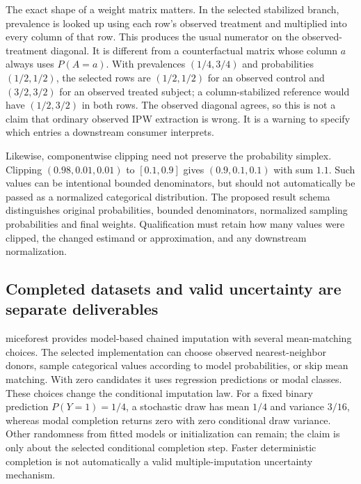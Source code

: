 The exact shape of a weight matrix matters. In the selected stabilized branch, prevalence is looked up using each row's observed treatment and multiplied into every column of that row. This produces the usual numerator on the observed-treatment diagonal. It is different from a counterfactual matrix whose column $a$ always uses $P(A=a)$. With prevalences $(1/4,3/4)$ and probabilities $(1/2,1/2)$, the selected rows are $(1/2,1/2)$ for an observed control and $(3/2,3/2)$ for an observed treated subject; a column-stabilized reference would have $(1/2,3/2)$ in both rows. The observed diagonal agrees, so this is not a claim that ordinary observed IPW extraction is wrong. It is a warning to specify which entries a downstream consumer interprets.~\citep{exec25_ptm_causallib,exec25_ptm_choice}

Likewise, componentwise clipping need not preserve the probability simplex. Clipping $(0.98,0.01,0.01)$ to $[0.1,0.9]$ gives $(0.9,0.1,0.1)$ with sum $1.1$. Such values can be intentional bounded denominators, but should not automatically be passed as a normalized categorical distribution. The proposed result schema distinguishes original probabilities, bounded denominators, normalized sampling probabilities and final weights. Qualification must retain how many values were clipped, the changed estimand or approximation, and any downstream normalization.~\citep{exec25_ptm_causallib,exec25_ptm_choice}

\subsection{Completed datasets and valid uncertainty are separate deliverables}

miceforest provides model-based chained imputation with several mean-matching choices. The selected implementation can choose observed nearest-neighbor donors, sample categorical values according to model probabilities, or skip mean matching. With zero candidates it uses regression predictions or modal classes. These choices change the conditional imputation law. For a fixed binary prediction $P(Y=1)=1/4$, a stochastic draw has mean $1/4$ and variance $3/16$, whereas modal completion returns zero with zero conditional draw variance. Other randomness from fitted models or initialization can remain; the claim is only about the selected conditional completion step. Faster deterministic completion is not automatically a valid multiple-imputation uncertainty mechanism.~\citep{exec25_ptm_miceforest,exec25_ptm_choice}

